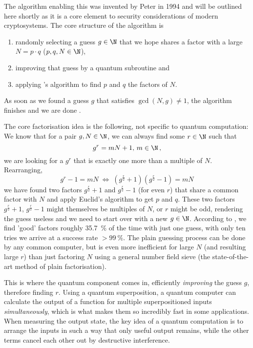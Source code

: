 The algorithm enabling this was invented by Peter  in 1994 and will be outlined here shortly as it is a core element to security considerations of modern cryptosystems.
The core structure of the algorithm is
\begin{enumerate}
  \item randomly selecting a guess $g \in \N$ that we hope shares a factor with a large $N = p \cdot q$ ($p, q, N \in \N$),
  \item improving that guess by a quantum subroutine and
  \item applying 's algorithm to find $p$ and $q$ the factors of $N$.
\end{enumerate}
As soon as we found a guess $g$ that satisfies $\gcd(N, g) \neq 1$, the algorithm finishes and we are done \parencite{1997-shors-algorithm}.

The core factorisation idea is the following, not specific to quantum computation: We know that for a pair $g, N \in \N$, we can always find some $r \in \N$ such that
$$g^r = m N + 1,\, m \in \N\,,$$
we are looking for a $g^r$ that is exactly one more than a multiple of $N$.
Rearranging,
$$g^r - 1 = m N \;\Longleftrightarrow\; (g^\frac{r}{2} + 1)(g^\frac{r}{2} - 1) = m N$$
we have found two factors $g^\frac{r}{2} + 1$ and $g^\frac{r}{2} - 1$ (for even $r$) that share a common factor with $N$ and apply Euclid's algorithm to get $p$ and $q$.
These two factors $g^\frac{r}{2} + 1$, $g^\frac{r}{2} - 1$ might themselves be multiples of $N$, or $r$ might be odd, rendering the guess useless and we need to start over with a new $g \in \N$.
According to \cite{1997-shors-algorithm}, we find 'good' factors roughly \SI{35.7}{\percent} of the time with just one guess, with only ten tries we arrive at a success rate $> \SI{99}{\percent}$.
The plain guessing process can be done by any common computer, but is even more inefficient for large $N$ (and resulting large $r$) than just factoring $N$ using a general number field sieve (the state-of-the-art method of plain factorisation).

This is where the quantum component comes in, efficiently \textit{improving} the guess $g$, therefore finding $r$.
Using a quantum superposition, a quantum computer can calculate the output of a function for multiple superpositioned inputs \textit{simultaneously}, which is what makes them so incredibly fast in some applications.
When measuring the output state, the key idea of a quantum computation is to arrange the inputs in such a way that only useful output remains, while the other terms cancel each other out by destructive interference.

